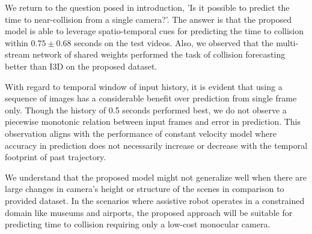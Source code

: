 We return to the question posed in introduction, 'Is it possible to predict the time to near-collision from a single camera?'. The answer is that the proposed model is able to leverage spatio-temporal cues for predicting the time to collision within $0.75 \pm 0.68$ seconds on the test videos. Also, we observed that the multi-stream network of shared weights performed the task of collision forecasting better than I3D on the proposed dataset. 

With regard to temporal window of input history, it is evident that using a sequence of images has a considerable benefit over prediction from single frame only. Though the history of 0.5 seconds performed best, we do not observe a piecewise monotonic relation between input frames and error in prediction. This observation aligns with the performance of constant velocity model where accuracy in prediction does not necessarily increase or decrease with the temporal footprint of past trajectory. 

We understand that the proposed model might not generalize well when there are large changes in camera's height or structure of the scenes in comparison to provided dataset. In the scenarios where assistive robot operates in a constrained domain like museums and airports, the proposed approach will be suitable for predicting time to collision requiring only a low-cost monocular camera.
